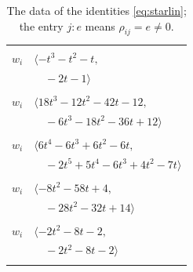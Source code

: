 \documentclass[11pt]{article}
\begin{document}
\begingroup\scriptsize
\setlength{\LTcapwidth}{\textwidth}
\begin{longtable}{@{}ll@{}}
\caption{The data of the identities \eqref{eq:starlin}; the entry $j{:}e$ means $\rho_{ij}=e\neq0$.}\label{tab:star}\\
\hline\endfirsthead\hline\endhead\hline\endfoot
\multicolumn{2}{@{}p{0.97\textwidth}@{}}{$i=0$, $D_i=1$, $\rho_{ij}$: $3{:}1, \allowbreak 5{:}2, \allowbreak 7{:}1, \allowbreak 10{:}1, \allowbreak 11{:}1, \allowbreak 26{:}2, \allowbreak 31{:}2, \allowbreak 33{:}1$}\\
$w_i$ & $\langle -t^{3}-t^{2}-t,$\\
 & $\quad -2t-1\rangle$\\
\addlinespace[2pt]
\multicolumn{2}{@{}p{0.97\textwidth}@{}}{$i=1$, $D_i=1$, $\rho_{ij}$: $4{:}2, \allowbreak 7{:}2, \allowbreak 16{:}2, \allowbreak 18{:}1, \allowbreak 22{:}2, \allowbreak 23{:}2, \allowbreak 25{:}1, \allowbreak 26{:}1, \allowbreak 27{:}1, \allowbreak 28{:}2, \allowbreak 29{:}2, \allowbreak 33{:}1$}\\
$w_i$ & $\langle 18t^{3}-12t^{2}-42t-12,$\\
 & $\quad -6t^{3}-18t^{2}-36t+12\rangle$\\
\addlinespace[2pt]
\multicolumn{2}{@{}p{0.97\textwidth}@{}}{$i=2$, $D_i=1$, $\rho_{ij}$: $6{:}1, \allowbreak 7{:}1, \allowbreak 9{:}2, \allowbreak 11{:}2, \allowbreak 13{:}1, \allowbreak 19{:}2, \allowbreak 21{:}2, \allowbreak 23{:}1, \allowbreak 25{:}1$}\\
$w_i$ & $\langle 6t^{4}-6t^{3}+6t^{2}-6t,$\\
 & $\quad -2t^{5}+5t^{4}-6t^{3}+4t^{2}-7t\rangle$\\
\addlinespace[2pt]
\multicolumn{2}{@{}p{0.97\textwidth}@{}}{$i=3$, $D_i=1$, $\rho_{ij}$: $0{:}2, \allowbreak 12{:}2, \allowbreak 13{:}1, \allowbreak 14{:}1, \allowbreak 15{:}2, \allowbreak 21{:}1, \allowbreak 22{:}1, \allowbreak 29{:}2, \allowbreak 31{:}2$}\\
$w_i$ & $\langle -8t^{2}-58t+4,$\\
 & $\quad -28t^{2}-32t+14\rangle$\\
\addlinespace[2pt]
\multicolumn{2}{@{}p{0.97\textwidth}@{}}{$i=4$, $D_i=1$, $\rho_{ij}$: $1{:}1, \allowbreak 17{:}1, \allowbreak 21{:}1, \allowbreak 24{:}2, \allowbreak 26{:}2, \allowbreak 29{:}2$}\\
$w_i$ & $\langle -2t^{2}-8t-2,$\\
 & $\quad -2t^{2}-8t-2\rangle$\\
\addlinespace[2pt]
\multicolumn{2}{@{}p{0.97\textwidth}@{}}{$i=5$, $D_i=1$, $\rho_{ij}$: $0{:}1, \allowbreak 10{:}1, \allowbreak 13{:}1, \allowbreak 17{:}2, \allowbreak 26{:}1, \allowbreak 28{:}2$}\\

\end{longtable}
\end{document}
